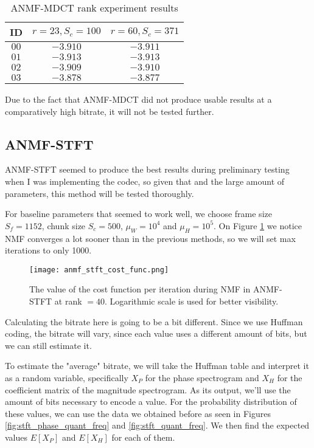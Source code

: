 \begin{table}[htbp]\caption{ANMF-MDCT rank experiment results}
	\label{tab:anmf_mdct_rank}
	\centering
	\begin{tabular}{|c|c|c|}
		\hline
		ID & $r = 23, S_c = 100$ & $r = 60, S_c = 371$ \\ \hline
		$00$ & $-3.910$ & $-3.911$ \\
		$01$ & $-3.913$ & $-3.913$ \\
		$02$ & $-3.909$ & $-3.910$ \\
		$03$ & $-3.878$ & $-3.877$ \\		
		\hline
	\end{tabular}
\end{table}

Due to the fact that ANMF-MDCT did not produce usable results at a comparatively high bitrate, it will not be tested further.

\subsection{ANMF-STFT}
ANMF-STFT seemed to produce the best results during preliminary testing when I was implementing the codec, so given that and the large amount of parameters, this method will be tested thoroughly.

For baseline parameters that seemed to work well, we choose frame size $S_f = 1152$, chunk size $S_c = 500$, $\mu_W = 10^4$ and $\mu_H = 10^5$. On Figure \ref{fig:anmf_stft_cost_func} we notice NMF converges a lot sooner than in the previous methods, so we will set max iterations to only 1000.

\begin{figure}[ht]
	\caption[ANMF-STFT cost function]{The value of the cost function per iteration during NMF in ANMF-STFT at rank $= 40$. Logarithmic scale is used for better visibility.}
	\label{fig:anmf_stft_cost_func}
	\centering
	\texttt{[image: anmf\_stft\_cost\_func.png]}
\end{figure}

Calculating the bitrate here is going to be a bit different. Since we use Huffman coding, the bitrate will vary, since each value uses a different amount of bits, but we can still estimate it.

To estimate the "average" bitrate, we will take the Huffman table and interpret it as a random variable, specifically $X_P$ for the phase spectrogram and $X_H$ for the coefficient matrix of the magnitude spectrogram. As its output, we'll use the amount of bits necessary to encode a value. For the probability distribution of these values, we can use the data we obtained before as seen in Figures \ref{fig:stft_phase_quant_freq} and \ref{fig:stft_quant_freq}. We then find the expected values $E[X_P]$ and $E[X_H]$ for each of them.

